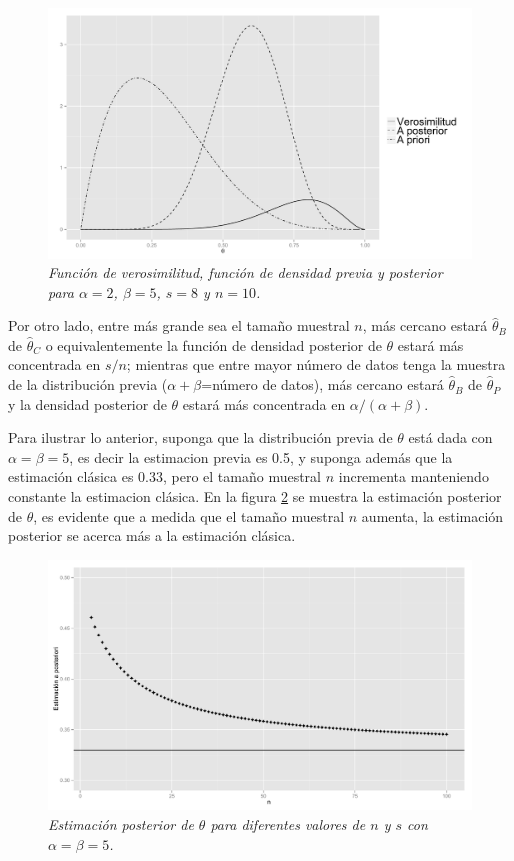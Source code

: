 \documentclass[10pt,openright]{book}\usepackage[]{graphicx}\usepackage[]{color}
\begin{document}
    \begin{figure}[!h]
    \centering
    \includegraphics[scale=0.4]{Beta_tres.pdf}
    \caption{\emph{Funci\'on de verosimilitud, funci\'on de densidad previa y posterior para $\alpha=2$, $\beta=5$, $s=8$ y $n=10$.}}
    \label{beta3}
    \end{figure}
    
    Por otro lado, entre m\'as grande sea el tama\~no muestral $n$, m\'as cercano estar\'a $\hat{\theta}_{B}$ de $\hat{\theta}_{C}$ o equivalentemente la funci\'on de densidad posterior de $\theta$ estar\'a m\'as concentrada en $s/n$; mientras que entre mayor n\'umero de datos tenga la muestra de la distribuci\'on previa ($\alpha+\beta$=n\'umero de datos), m\'as cercano estar\'a $\hat{\theta}_{B}$ de $\hat{\theta}_{P}$ y la densidad posterior de $\theta$ estar\'a m\'as concentrada en $\alpha/(\alpha+\beta)$.
    
    Para ilustrar lo anterior, suponga que la distribuci\'on previa de $\theta$ est\'a dada con $\alpha=\beta=5$, es decir la estimacion previa es 0.5, y suponga adem\'as que la estimaci\'on cl\'asica es 0.33, pero el tama\~no muestral $n$ incrementa manteniendo constante la estimacion cl\'asica. En la figura \ref{betan} se muestra la estimaci\'on posterior de $\theta$, es evidente que a medida que el tama\~no muestral $n$ aumenta, la estimaci\'on posterior se acerca m\'as a la estimaci\'on cl\'asica.
    
    \begin{figure}[!h]
    \centering
    \includegraphics[scale=0.35]{Beta_n_aumen.pdf}
    \caption{\emph{Estimaci\'on posterior de $\theta$ para diferentes valores de $n$ y $s$ con $\alpha=\beta=5$.}}
    \label{betan}
    \end{figure}
    
\end{document}
